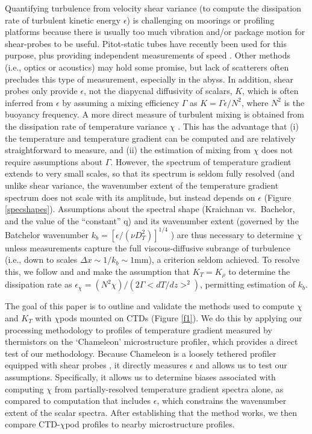 \documentclass{ametsoc}
\begin{document}
Quantifying turbulence from velocity shear variance (to compute the dissipation rate of turbulent kinetic energy $\epsilon$) is challenging on moorings or profiling platforms because there is usually too much vibration and/or package motion for shear-probes to be useful. Pitot-static tubes have recently been used for this purpose, plus providing independent measurements of speed \citep{moum15}. Other methods (i.e., optics or acoustics) may hold some promise, but lack of scatterers often precludes this type of measurement, especially in the abyss.  In addition, shear probes only provide $\epsilon$, not the diapycnal diffusivity of scalars, $K$, which is often inferred from $\epsilon$ by assuming a mixing efficiency $\Gamma$ \citep{osborn80} as $K=\Gamma \epsilon / N^{2}$, where $N^2$ is the buoyancy frequency.  A more direct measure of turbulent mixing is obtained from the dissipation rate of temperature variance $\chi$ \citep{osborncox72}.  This has the advantage that (i) the temperature and temperature gradient can be computed and are relatively straightforward to measure, and (ii) the estimation of mixing from $\chi$ does not require assumptions about $\Gamma$. However, the spectrum of temperature gradient extends to very small scales, so that its spectrum is seldom fully resolved (and unlike shear variance, the wavenumber extent of the temperature gradient spectrum does not scale with its amplitude, but instead depends on $\epsilon$ (Figure \ref{specshapes}). Assumptions about the spectral shape (Kraichnan vs.\ Bachelor, and the value of the ``constant'' q) and its wavenumber extent (governed by the Batchelor wavenumber $k_b=[\epsilon/(\nu D_{T}^{2})]^{1/4}$  \citep{Batchelor59}) are thus necessary to determine $\chi$ unless measurements capture the full viscous-diffusive subrange of turbulence (i.e., down to scales $\Delta x \sim 1/k_b \sim 1$mm), a criterion seldom achieved.  To resolve this, we follow \cite{alfordpinkel00b} and \cite{moumnash09} and make the assumption that $K_T=K_{\rho}$ to determine the dissipation rate as $\epsilon_{\chi}=(N^2\chi)/(2\Gamma <dT/dz>^2)$, permitting estimation of $k_b$. 


The goal of this paper is to outline and validate the methods used to compute $\chi$ and $K_T$ with $\chi$pods mounted on CTDs (Figure \ref{f1}).  We do this by applying our processing methodology to profiles of temperature gradient measured by thermistors on the `Chameleon' microstructure profiler, which provides a direct test of our methodology.  Because Chameleon is a loosely tethered profiler equipped with shear probes \citep{moumetal95}, it directly measures $\epsilon$ and allows us to test our assumptions.  Specifically, it allows us to determine biases associated with computing $\chi$ from partially-resolved temperature gradient spectra alone, as compared to computation that includes $\epsilon$, which constrains the wavenumber extent of the scalar spectra.   After establishing that the method works, we then compare CTD-$\chi$pod profiles to nearby microstructure profiles.
\end{document}
